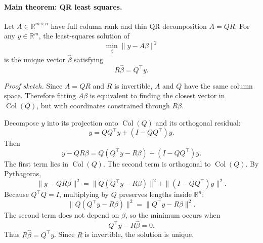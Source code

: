 \paragraph{Main theorem: QR least squares.}
Let \(A\in\mathbb{R}^{m\times n}\) have full column rank and thin QR decomposition \(A=QR\). For any \(y\in\mathbb{R}^m\), the least-squares solution of
\[
\min_\beta \|y-A\beta\|^2
\]
is the unique vector \(\hat\beta\) satisfying
\[
R\hat\beta=Q^\top y.
\]

\emph{Proof sketch.} Since \(A=QR\) and \(R\) is invertible, \(A\) and \(Q\) have the same column space. Therefore fitting \(A\beta\) is equivalent to finding the closest vector in \(\operatorname{Col}(Q)\), but with coordinates constrained through \(R\beta\).

Decompose \(y\) into its projection onto \(\operatorname{Col}(Q)\) and its orthogonal residual:
\[
y=QQ^\top y+(I-QQ^\top)y.
\]
Then
\[
y-QR\beta
=Q(Q^\top y-R\beta)+(I-QQ^\top)y.
\]
The first term lies in \(\operatorname{Col}(Q)\). The second term is orthogonal to \(\operatorname{Col}(Q)\). By Pythagoras,
\[
\|y-QR\beta\|^2
=\|Q(Q^\top y-R\beta)\|^2+\|(I-QQ^\top)y\|^2.
\]
Because \(Q^\top Q=I\), multiplying by \(Q\) preserves lengths inside \(\mathbb{R}^n\):
\[
\|Q(Q^\top y-R\beta)\|^2=\|Q^\top y-R\beta\|^2.
\]
The second term does not depend on \(\beta\), so the minimum occurs when
\[
Q^\top y-R\hat\beta=0.
\]
Thus \(R\hat\beta=Q^\top y\). Since \(R\) is invertible, the solution is unique.

